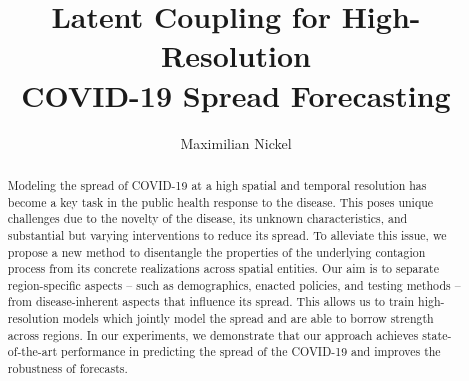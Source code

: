 \documentclass{article}
\author{Maximilian Nickel}
\date{}
\title{Latent Coupling for High-Resolution \\  COVID-19 Spread Forecasting}
\begin{document}
\maketitle
\author{}


\begin{abstract}
Modeling the spread of COVID-19 at a high spatial and temporal resolution has
become a key task in the public health response to the disease. This poses
unique challenges due to the novelty of the disease, its unknown
characteristics, and substantial but varying interventions to reduce its spread.
To alleviate this issue, we propose a new method to disentangle the properties
of the underlying contagion process from its concrete realizations across
spatial entities. Our aim is to separate region-specific aspects -- such as
demographics, enacted policies, and testing methods -- from disease-inherent
aspects that influence its spread. This allows us to train high-resolution
models which jointly model the spread and are able to borrow strength across
regions. In our experiments, we demonstrate that our approach achieves
state-of-the-art performance in predicting the spread of the COVID-19 and
improves the robustness of forecasts.
\end{abstract}
\end{document}
